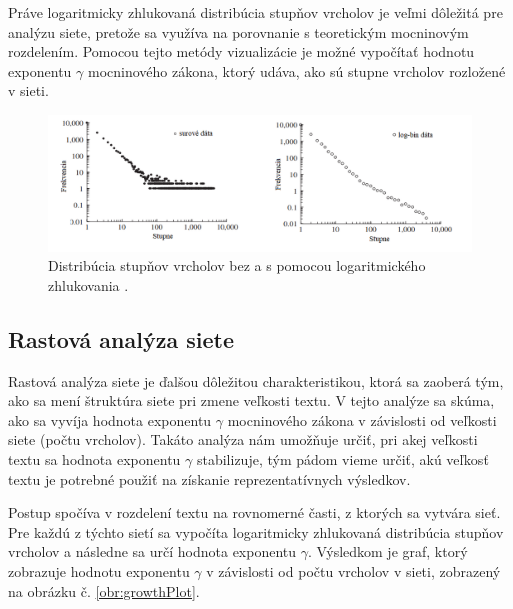 Práve logaritmicky zhlukovaná distribúcia stupňov vrcholov je veľmi dôležitá pre analýzu siete, pretože sa využíva na porovnanie
s teoretickým mocninovým rozdelením. Pomocou tejto metódy vizualizácie je možné vypočítať hodnotu exponentu $\gamma$ mocninového zákona, ktorý
udáva, ako sú stupne vrcholov rozložené v sieti.

\clearpage

\begin{figure}
    \centerline{\includegraphics[width=1\textwidth]{images/rawLogBinnedDegDist.png}}
    \caption[Distribúcia stupňov vrcholov bez a s pomocou logaritmického zhlukovania.]{Distribúcia stupňov vrcholov bez a s pomocou logaritmického zhlukovania \cite{milojevic2010power}.}
    \label{obr:rawLogBinnedDegDist}
\end{figure}

\subsection{Rastová analýza siete}\label{sec:growthAnalysis}

Rastová analýza siete je ďalšou dôležitou charakteristikou, ktorá sa zaoberá tým, ako sa mení štruktúra siete pri zmene veľkosti textu. V tejto analýze
sa skúma, ako sa vyvíja hodnota exponentu $\gamma$ mocninového zákona v závislosti od veľkosti siete (počtu vrcholov). 
Takáto analýza nám umožňuje určiť, pri akej veľkosti textu sa hodnota exponentu $\gamma$ stabilizuje, tým pádom vieme určiť, akú veľkosť textu je potrebné
použiť na získanie reprezentatívnych výsledkov.

Postup spočíva v rozdelení textu na rovnomerné časti, z ktorých sa vytvára sieť. Pre každú z týchto sietí sa vypočíta logaritmicky zhlukovaná distribúcia stupňov vrcholov
a následne sa určí hodnota exponentu $\gamma$. Výsledkom je graf, ktorý zobrazuje hodnotu exponentu $\gamma$ v závislosti od počtu vrcholov v sieti, zobrazený na obrázku č. \ref{obr:growthPlot}.


